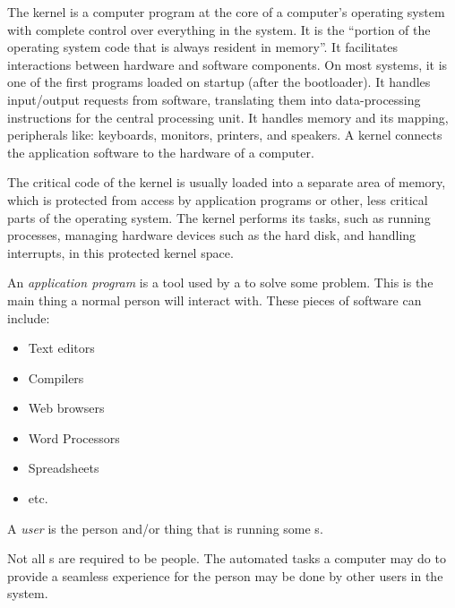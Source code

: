 \begin{definition}[Kernel]\label{def:Kernel}
  The kernel is a computer program at the core of a computer's operating system with complete control over everything in the system.
  It is the ``portion of the operating system code that is always resident in memory''.
  It facilitates interactions between hardware and software components.
  On most systems, it is one of the first programs loaded on startup (after the bootloader).
  It handles input/output requests from software, translating them into data-processing instructions for the central processing unit.
  It handles memory and its mapping, peripherals like: keyboards, monitors, printers, and speakers.
  A kernel connects the application software to the hardware of a computer.

  The critical code of the kernel is usually loaded into a separate area of memory, which is protected from access by application programs or other, less critical parts of the operating system.
  The kernel performs its tasks, such as running processes, managing hardware devices such as the hard disk, and handling interrupts, in this protected kernel space.
\end{definition}

\begin{definition}\label{def:Application_Program}
  An \emph{application program} is a tool used by a  to solve some problem.
  This is the main thing a normal person will interact with.
  These pieces of software can include:
  \begin{itemize}[noitemsep]
  \item Text editors
  \item Compilers
  \item Web browsers
  \item Word Processors
  \item Spreadsheets
  \item etc.
  \end{itemize}
\end{definition}

\begin{definition}[User]\label{def:User}
  A \emph{user} is the person and/or thing that is running some s.

  \begin{remark}\label{rmk:Thing_Users}
    Not all s are required to be people.
    The automated tasks a computer may do to provide a seamless experience for the person may be done by other users in the system.
  \end{remark}
\end{definition}

